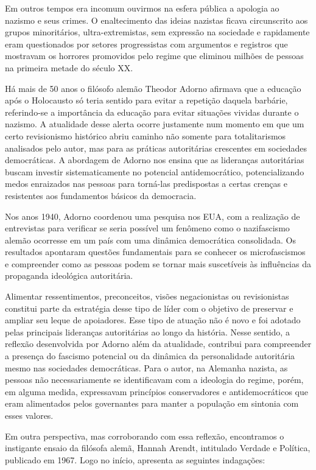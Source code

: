 Em outros tempos era incomum ouvirmos na esfera pública a apologia ao
nazismo e seus crimes. O enaltecimento das ideias nazistas ficava
circunscrito aos grupos minoritários, ultra-extremistas, sem expressão
na sociedade e rapidamente eram questionados por setores progressistas
com argumentos e registros que mostravam os horrores promovidos pelo
regime que eliminou milhões de pessoas na primeira metade do século XX.

Há mais de 50 anos o filósofo alemão Theodor Adorno afirmava que a
educação após o Holocausto só teria sentido para evitar a repetição
daquela barbárie, referindo-se a importância da educação para evitar
situações vividas durante o nazismo. A atualidade desse alerta ocorre
justamente num momento em que um certo revisionismo histórico abriu
caminho não somente para totalitarismos analisados pelo autor, mas para
as práticas autoritárias crescentes em sociedades democráticas. A
abordagem de Adorno nos ensina que as lideranças autoritárias buscam
investir sistematicamente no potencial antidemocrático, potencializando
medos enraizados nas pessoas para torná-las predispostas a certas
crenças e resistentes aos fundamentos básicos da democracia.

Nos anos 1940, Adorno coordenou uma pesquisa nos EUA, com a realização
de entrevistas para verificar se seria possível um fenômeno como o
nazifascismo alemão ocorresse em um país com uma dinâmica democrática
consolidada. Os resultados apontaram questões fundamentais para se
conhecer os microfascismos e compreender como as pessoas podem se tornar
mais suscetíveis às influências da propaganda ideológica autoritária.

Alimentar ressentimentos, preconceitos, visões negacionistas ou
revisionistas constitui parte da estratégia desse tipo de líder com o
objetivo de preservar e ampliar seu leque de apoiadores. Esse tipo de
atuação não é novo e foi adotado pelas principais lideranças
autoritárias ao longo da história. Nesse sentido, a reflexão
desenvolvida por Adorno além da atualidade, contribui para compreender a
presença do fascismo potencial ou da dinâmica da personalidade
autoritária mesmo nas sociedades democráticas. Para o autor, na Alemanha
nazista, as pessoas não necessariamente se identificavam com a ideologia
do regime, porém, em alguma medida, expressavam princípios conservadores
e antidemocráticos que eram alimentados pelos governantes para manter a
população em sintonia com esses valores.

Em outra perspectiva, mas corroborando com essa reflexão, encontramos o
instigante ensaio da filósofa alemã, Hannah Arendt, intitulado Verdade e
Política, publicado em 1967. Logo no início, apresenta as seguintes
indagações:

